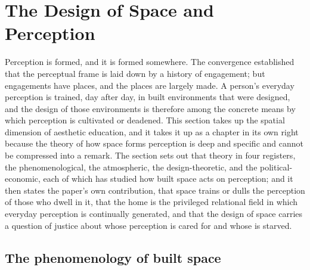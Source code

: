 \section{The Design of Space and Perception}
\label{p23:sec:space}

\noindent
Perception is formed, and it is formed somewhere. The convergence established that the perceptual frame is laid down by a history of engagement; but engagements have places, and the places are largely made. A person's everyday perception is trained, day after day, in built environments that were designed, and the design of those environments is therefore among the concrete means by which perception is cultivated or deadened. This section takes up the spatial dimension of aesthetic education, and it takes it up as a chapter in its own right because the theory of how space forms perception is deep and specific and cannot be compressed into a remark. The section sets out that theory in four registers, the phenomenological, the atmospheric, the design-theoretic, and the political-economic, each of which has studied how built space acts on perception; and it then states the paper's own contribution, that space trains or dulls the perception of those who dwell in it, that the home is the privileged relational field in which everyday perception is continually generated, and that the design of space carries a question of justice about whose perception is cared for and whose is starved.

\subsection{The phenomenology of built space}
\label{p23:sub:space-phenomenology}

